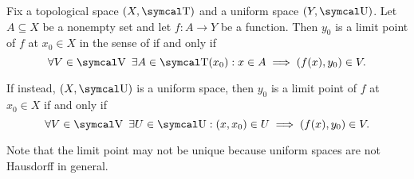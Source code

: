 \begin{definition}\label{}

\end{definition}

\begin{proposition}\label{thm:uniform_space_local_convergence}
  Fix a topological space \( (X, \CT) \) and a uniform space \( (Y, \CU) \). Let \( A \subseteq X \) be a nonempty set and let \( f: A \to Y \) be a function. Then \( y_0 \) is a limit point of \( f \) at \( x_0 \in X \) in the sense of  if and only if
  \begin{equation}\label{thm:uniform_space_local_continuity/topological_source}
    \forall V \in \CV \ \exists A \in \CT(x_0) : x \in A \implies (f(x), y_0) \in V.
  \end{equation}

  If instead, \( (X, \CU) \) is a uniform space, then \( y_0 \) is a limit point of \( f \) at \( x_0 \in X \) if and only if
  \begin{equation}\label{thm:uniform_space_local_continuity/uniform_source}
    \forall V \in \CV \ \exists U \in \CU : (x, x_0) \in U \implies (f(x), y_0) \in V.
  \end{equation}

  Note that the limit point may not be unique because uniform spaces are not Hausdorff in general.
\end{proposition}
